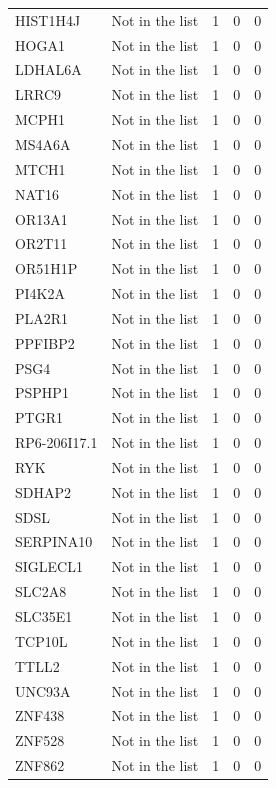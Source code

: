 \documentclass[12pt,twoside]{reedthesis}
\theoremstyle{definition}
\theoremstyle{definition}
\theoremstyle{remark}
\begin{document}
\begin{longtable}[t]{llrrr}
  HIST1H4J & Not in the list & 1 & 0 & 0\\
  \addlinespace
  HOGA1 & Not in the list & 1 & 0 & 0\\
  LDHAL6A & Not in the list & 1 & 0 & 0\\
  LRRC9 & Not in the list & 1 & 0 & 0\\
  MCPH1 & Not in the list & 1 & 0 & 0\\
  MS4A6A & Not in the list & 1 & 0 & 0\\
  \addlinespace
  MTCH1 & Not in the list & 1 & 0 & 0\\
  NAT16 & Not in the list & 1 & 0 & 0\\
  OR13A1 & Not in the list & 1 & 0 & 0\\
  OR2T11 & Not in the list & 1 & 0 & 0\\
  OR51H1P & Not in the list & 1 & 0 & 0\\
  \addlinespace
  PI4K2A & Not in the list & 1 & 0 & 0\\
  PLA2R1 & Not in the list & 1 & 0 & 0\\
  PPFIBP2 & Not in the list & 1 & 0 & 0\\
  PSG4 & Not in the list & 1 & 0 & 0\\
  PSPHP1 & Not in the list & 1 & 0 & 0\\
  \addlinespace
  PTGR1 & Not in the list & 1 & 0 & 0\\
  RP6-206I17.1 & Not in the list & 1 & 0 & 0\\
  RYK & Not in the list & 1 & 0 & 0\\
  SDHAP2 & Not in the list & 1 & 0 & 0\\
  SDSL & Not in the list & 1 & 0 & 0\\
  \addlinespace
  SERPINA10 & Not in the list & 1 & 0 & 0\\
  SIGLECL1 & Not in the list & 1 & 0 & 0\\
  SLC2A8 & Not in the list & 1 & 0 & 0\\
  SLC35E1 & Not in the list & 1 & 0 & 0\\
  TCP10L & Not in the list & 1 & 0 & 0\\
  \addlinespace
  TTLL2 & Not in the list & 1 & 0 & 0\\
  UNC93A & Not in the list & 1 & 0 & 0\\
  ZNF438 & Not in the list & 1 & 0 & 0\\
  ZNF528 & Not in the list & 1 & 0 & 0\\
  ZNF862 & Not in the list & 1 & 0 & 0\\
  \bottomrule
  \end{longtable}
  
\end{document}
